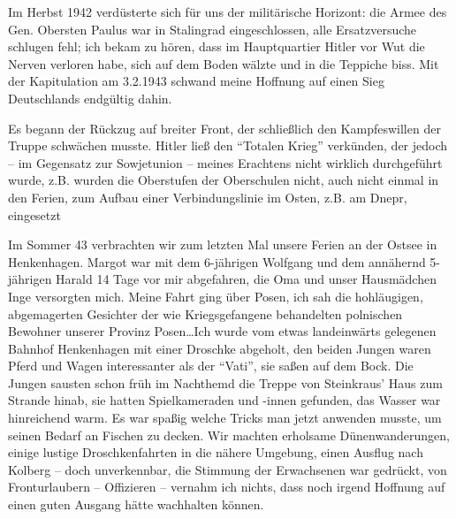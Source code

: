 Im Herbst 1942 verdüsterte sich für uns der militärische Horizont: die Armee des Gen. Obersten Paulus war in Stalingrad eingeschlossen, alle Ersatzversuche schlugen fehl; ich bekam zu hören, dass im Hauptquartier Hitler vor Wut die Nerven verloren habe, sich auf dem Boden wälzte und in die Teppiche biss. Mit der Kapitulation am 3.2.1943 schwand meine Hoffnung auf einen Sieg Deutschlands endgültig dahin.

 Es begann der Rückzug auf breiter Front, der schließlich den Kampfeswillen der Truppe schwächen musste. Hitler ließ den \enquote{Totalen Krieg} verkünden, der jedoch -- im Gegensatz zur Sowjetunion -- meines Erachtens nicht wirklich durchgeführt wurde, z.B. wurden die Oberstufen der Oberschulen nicht, auch nicht einmal in den Ferien, zum Aufbau einer Verbindungslinie im Osten, z.B. am Dnepr, eingesetzt

 Im Sommer 43 verbrachten wir zum letzten Mal unsere Ferien an der Ostsee in Henkenhagen. Margot war mit dem 6-jährigen Wolfgang und dem annähernd 5-jährigen Harald 14 Tage vor mir abgefahren, die Oma und unser Hausmädchen Inge versorgten mich. Meine Fahrt ging über Posen, ich sah die hohläugigen, abgemagerten Gesichter der wie Kriegsgefangene behandelten polnischen Bewohner unserer Provinz Posen\dots Ich wurde vom etwas landeinwärts gelegenen Bahnhof Henkenhagen mit einer Droschke abgeholt, den beiden Jungen waren Pferd und Wagen interessanter als der \enquote{Vati}, sie saßen auf dem Bock. Die Jungen sausten schon früh im Nachthemd die Treppe von Steinkraus' Haus zum Strande hinab, sie hatten Spielkameraden und -innen gefunden, das Wasser war hinreichend warm. Es war spaßig  welche Tricks man jetzt anwenden musste, um seinen Bedarf an Fischen zu decken. Wir machten erholsame Dünenwanderungen, einige lustige Droschkenfahrten in die nähere Umgebung, einen Ausflug nach Kolberg -- doch unverkennbar, die Stimmung der Erwachsenen war gedrückt, von Fronturlaubern -- Offizieren -- vernahm ich nichts, dass noch irgend Hoffnung auf einen guten Ausgang hätte wachhalten können.

